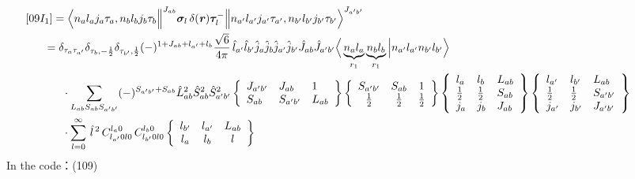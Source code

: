 \documentclass[master]{shnuthesis}
\newcommand{\bmr}{\textbf{\textit{r}}}
\newcommand{\ap}{a^\prime}
\newcommand{\bp}{b^\prime}
\newcommand{\il}{\!\!\!\!\!\!\!\!\!\!}
\newcommand{\ii}{\!\!\!\!\!\!\!\!\!\!\!\!\!\!\!\!\!\!\!\!}
\begin{document}
\begin{align}
    &\ii [09I_1] = \Big\langle n_a l_a j_a \tau_a, n_b l_b j_b \tau_b \Big\|^{J_{ab}} \bm{\sigma}_l \,\delta(\bmr) \bm{\tau}_l^- \Big\| n_{\ap} l_{\ap} j_{\ap} \tau_{\ap}, n_{\bp} l_{\bp} j_{\bp} \tau_{\bp} \Big\rangle^{J_{\ap \bp}} \\
    &\il = \delta_{\tau_a \tau_{\ap}}\delta_{\tau_b, -\frac{1}{2}}\delta_{\tau_{\bp}, \frac{1}{2}} (-)^{1+J_{ab}+l_{\ap}+l_b}\frac{\sqrt{6}}{4\pi}\,\hat{l}_{\ap}\hat{l}_{\bp}\hat{j}_a\hat{j}_b\hat{j}_{\ap}\hat{j}_{\bp}\hat{J}_{ab}\hat{J}_{\ap\bp} \Big\langle \underbrace{n_a l_a}_{r_1} \underbrace{n_b l_b}_{r_1} \Big| n_{\ap} l_{\ap} n_{\bp} l_{\bp} \Big\rangle \notag \\
    & \cdot \sum_{L_{ab}S_{ab}S_{\ap\bp}} (-)^{S_{\ap\bp}+S_{ab}}\hat{L}_{ab}^2\hat{S}_{ab}^2\hat{S}_{\ap\bp}^2  \left\{\begin{array}{lll} J_{\ap\bp} & J_{ab} & 1 \\ S_{ab} & S_{\ap\bp} & L_{ab} \end{array}\right\}    \left\{\begin{array}{ccc} S_{\ap\bp} & S_{ab} & 1 \\ \frac{1}{2} & \frac{1}{2} & \frac{1}{2} \end{array}\right\}  \left\{\begin{array}{lll}l_{a} & l_{b} & L_{ab} \\ \frac{1}{2} & \frac{1}{2} & S_{ab} \\j_{a} & j_{b} & J_{ab} \end{array}\right\}  \left\{\begin{array}{lll}l_{\ap} & l_{\bp} & L_{ab} \\ \frac{1}{2} & \frac{1}{2} & S_{\ap\bp} \\j_{\ap} & j_{\bp} & J_{\ap\bp} \end{array}\right\}  \notag\\
    & \cdot \sum_{l=0}^\infty \,\hat{l}^{\,2}\,C_{l_{\ap} 0 l 0}^{l_a 0} \,C_{l_{\bp} 0 l 0}^{l_b 0}  \left\{\begin{array}{ccc} l_{\bp} & l_{\ap} & L_{ab} \\ l_a & l_b & l \end{array}\right\}
\end{align}
In the code：(109)
\end{document}
